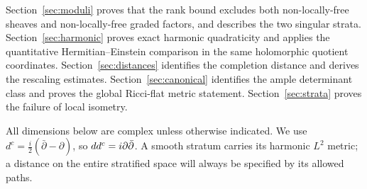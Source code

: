 Section~\ref{sec:moduli} proves that the rank bound excludes both
non-locally-free sheaves and non-locally-free graded factors, and
describes the two singular strata. Section~\ref{sec:harmonic}
proves exact harmonic quadraticity and applies the quantitative
Hermitian--Einstein comparison in the same holomorphic quotient
coordinates. Section~\ref{sec:distances} identifies the completion
distance and derives the rescaling estimates.
Section~\ref{sec:canonical} identifies the ample determinant class
and proves the global Ricci-flat metric statement.
Section~\ref{sec:strata} proves the failure of local isometry.

All dimensions below are complex unless otherwise indicated.
We use $d^c=\frac{i}{2}(\bar\partial-\partial)$, so
$dd^c=i\partial\bar\partial$. A smooth stratum carries its
harmonic $L^2$ metric; a distance on the entire stratified space
will always be specified by its allowed paths.

